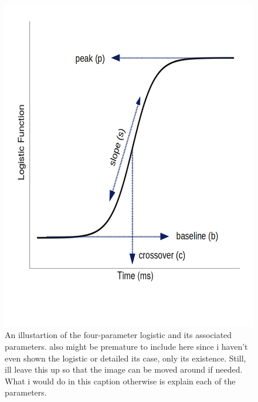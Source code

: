 \documentclass{article}
\begin{document}



\begin{figure}[h]
\centering
\includegraphics[scale=0.4]{logistic_label.png}
\caption{An illustartion of the four-parameter logistic and its associated parameters. also might be premature to include here since i haven't even shown the logistic or detailed its case, only its existence. Still, ill leave this up so that the image can be moved around if needed. What i would do in this caption otherwise is explain each of the parameters.}
\label{fig:bob_diagram_full}
\end{figure}
\end{document}
